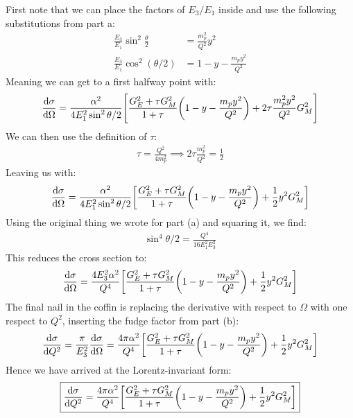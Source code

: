 \documentclass[12pt]{article}
\begin{document}
First note that we can place the factors of $E_3/E_1$ inside and use the following substitutions from part a:
\begin{align*}
  \frac{E_3}{E_1}\sin^2\frac{\theta}{2}&=\frac{m_p^2}{Q^2}y^2\\
  \frac{E_3}{E_1}\cos^2(\theta/2)&=1-y-\frac{m_p y^2}{Q^2}
\end{align*}
Meaning we can get to a first halfway point with:
\begin{align*}
  \dv{\sigma}{\Omega}=\frac{\alpha^2}{4E_1^2\sin^2\theta/2}
  \qty[\frac{G_E^2+\tau G_M^2}{1+\tau}\qty(1-y-\frac{m_p y^2}{Q^2})
  +2\tau \frac{m_p^2y^2}{Q^2}G_M^2]
\end{align*}
We can then use the definition of $\tau$:
\begin{align*}
  \tau=\frac{Q^2}{4m_p^2}\implies2\tau\frac{m_p^2}{Q^2}=\frac12
\end{align*}
Leaving us with:
\begin{align*}
  \dv{\sigma}{\Omega}=\frac{\alpha^2}{4E_1^2\sin^2\theta/2}
  \qty[\frac{G_E^2+\tau G_M^2}{1+\tau}\qty(1-y-\frac{m_p y^2}{Q^2})
  +\frac12y^2G_M^2]
\end{align*}
Using the original thing we wrote for part (a) and squaring it, we find:
\begin{align*}
  \sin^4\theta/2=\frac{Q^4}{16E_1^2E_3^2}
\end{align*}
This reduces the cross section to:
\begin{align*}
  \dv{\sigma}{\Omega}=\frac{4E_3^2\alpha^2}{Q^4}
  \qty[\frac{G_E^2+\tau G_M^2}{1+\tau}\qty(1-y-\frac{m_p y^2}{Q^2})
  +\frac12y^2G_M^2]
\end{align*}
The final nail in the coffin is replacing the derivative with respect to $\Omega$ with one respect to $Q^2$, inserting the fudge factor from part (b):
\begin{align*}
  \dv{\sigma}{Q^2}=\frac{\pi}{E_3^2}\dv{\sigma}{\Omega
  }=\frac{4\pi\alpha^2}{Q^4}
  \qty[\frac{G_E^2+\tau G_M^2}{1+\tau}\qty(1-y-\frac{m_p y^2}{Q^2})
  +\frac12y^2G_M^2]
\end{align*}
Hence we have arrived at the Lorentz-invariant form:
\begin{equation}
  \label{eq:p4c}
  \boxed{\dv{\sigma}{Q^2}=\frac{4\pi\alpha^2}{Q^4}
  \qty[\frac{G_E^2+\tau G_M^2}{1+\tau}\qty(1-y-\frac{m_p y^2}{Q^2})
  +\frac12y^2G_M^2]}
\end{equation}
\newpage
\end{document}
